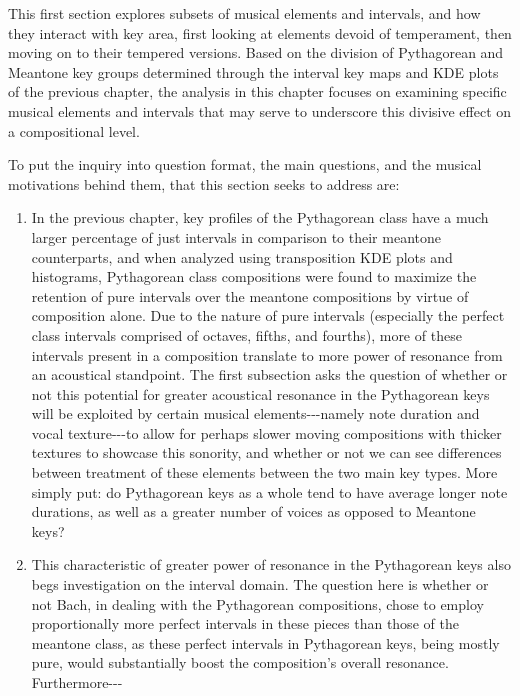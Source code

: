 This first section explores subsets of musical elements and intervals,
and how they interact with key area, first looking at elements devoid of
temperament, then moving on to their tempered versions. Based on the
division of Pythagorean and Meantone key groups determined through the
interval key maps and KDE plots of the previous chapter, the analysis in
this chapter focuses on examining specific musical elements and
intervals that may serve to underscore this divisive effect on a
compositional level.

To put the inquiry into question format, the main questions, and the
musical motivations behind them, that this section seeks to address are:

\begin{enumerate}
\def\labelenumi{\arabic{enumi}.}
\tightlist
\item
  In the previous chapter, key profiles of the Pythagorean class have a
  much larger percentage of just intervals in comparison to their
  meantone counterparts, and when analyzed using transposition KDE plots
  and histograms, Pythagorean class compositions were found to maximize
  the retention of pure intervals over the meantone compositions by
  virtue of composition alone. Due to the nature of pure intervals
  (especially the perfect class intervals comprised of octaves, fifths,
  and fourths), more of these intervals present in a composition
  translate to more power of resonance from an acoustical standpoint.
  The first subsection asks the question of whether or not this
  potential for greater acoustical resonance in the Pythagorean keys
  will be exploited by certain musical elements-\/-\/-namely note
  duration and vocal texture-\/-\/-to allow for perhaps slower moving
  compositions with thicker textures to showcase this sonority, and
  whether or not we can see differences between treatment of these
  elements between the two main key types. More simply put: do
  Pythagorean keys as a whole tend to have average longer note
  durations, as well as a greater number of voices as opposed to
  Meantone keys?
\item
  This characteristic of greater power of resonance in the Pythagorean
  keys also begs investigation on the interval domain. The question here
  is whether or not Bach, in dealing with the Pythagorean compositions,
  chose to employ proportionally more perfect intervals in these pieces
  than those of the meantone class, as these perfect intervals in
  Pythagorean keys, being mostly pure, would substantially boost the
  composition's overall resonance. Furthermore-\/-\/-

\end{enumerate}
